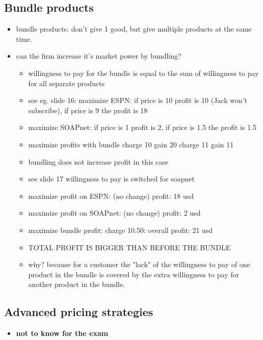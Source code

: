 \documentclass[12pt, a4paper, titlepage]{extarticle}
\begin{document}
	\subsection{Bundle products}
	\begin{itemize}
	\item bundle products: don't give 1 good, but give multiple products at the same time.
	\item can the firm increase it's market power by bundling?
	\begin{itemize}
	\item willingness to pay for the bundle is equal to the sum of willingness to pay for all separate products
	\item see eg. slide 16: maximize ESPN: if price is 10 profit is 10 (Jack won't subscribe), if price is 9 the profit is 18
	\item maximize SOAPnet: if price is 1 profit is 2, if price is 1.5 the profit is 1.5
	\item maximize profits with bundle charge 10 gain 20 charge 11 gain 11
	\item bundling does not increase profit in this case
	\end{itemize}
	\begin{itemize}
	\item see slide 17 willingness to pay is switched for soapnet
	\item maximize profit on ESPN: (no change) profit: 18 usd
	\item maximize profit on SOAPnet: (no change) profit: 2 usd
	\item maximize bundle profit: charge 10.50: overall profit: 21 usd 
	\item TOTAL PROFIT IS BIGGER THAN BEFORE THE BUNDLE
	\item why? because for a customer the "lack" of the willingness to pay of one product in the bundle is covered by the extra willingness to pay for another product in the bundle.
	\end{itemize}
	\end{itemize}
	\subsection{Advanced pricing strategies}
	\begin{itemize}
	\item \textbf{not to know for the exam}
	\end{itemize}
\end{document}
